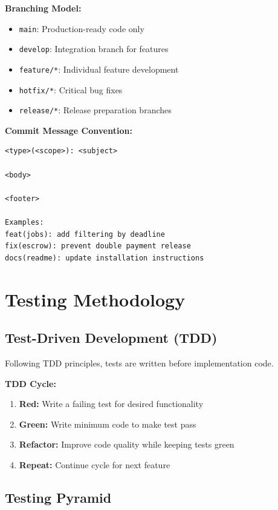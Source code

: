 \documentclass[a4paper,13pt,twoside]{report}
\theoremstyle{definition}
\begin{document}
\textbf{Branching Model:}
\begin{itemize}
    \item \texttt{main}: Production-ready code only
    \item \texttt{develop}: Integration branch for features
    \item \texttt{feature/*}: Individual feature development
    \item \texttt{hotfix/*}: Critical bug fixes
    \item \texttt{release/*}: Release preparation branches
\end{itemize}

\textbf{Commit Message Convention:}
\begin{lstlisting}[caption=Commit Message Format]
<type>(<scope>): <subject>

<body>

<footer>

Examples:
feat(jobs): add filtering by deadline
fix(escrow): prevent double payment release
docs(readme): update installation instructions
\end{lstlisting}

\section{Testing Methodology}

\subsection{Test-Driven Development (TDD)}

Following TDD principles, tests are written before implementation code.

\textbf{TDD Cycle:}
\begin{enumerate}
    \item \textbf{Red:} Write a failing test for desired functionality
    \item \textbf{Green:} Write minimum code to make test pass
    \item \textbf{Refactor:} Improve code quality while keeping tests green
    \item \textbf{Repeat:} Continue cycle for next feature
\end{enumerate}

\subsection{Testing Pyramid}
\end{document}
